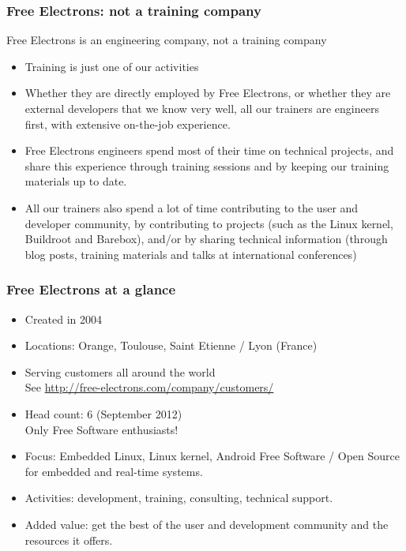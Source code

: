 \begin{frame}
\frametitle{Free Electrons: not a training company}
  Free Electrons is an engineering company, not a training company
  \begin{itemize}
    \item Training is just one of our activities
    \item Whether they are directly employed by Free Electrons, or whether
          they are external developers that we know very well, all 
          our trainers are engineers first, with extensive on-the-job
          experience.
    \item Free Electrons engineers spend most of their time on technical projects,
          and share this experience through training sessions and by
          keeping our training materials up to date.
    \item All our trainers also spend a lot of time contributing to the user
          and developer community, by contributing to projects (such as the Linux kernel,
          Buildroot and Barebox), and/or by sharing technical information (through
          blog posts, training materials and talks at international
          conferences)
  \end{itemize}
\end{frame}

\begin{frame}
\frametitle{Free Electrons at a glance}
  \begin{itemize}
    \item Created in 2004
    \item Locations: Orange, Toulouse, Saint Etienne / Lyon (France)
    \item Serving customers all around the world \\
          See \url{http://free-electrons.com/company/customers/}
    \item Head count: 6 (September 2012) \\
	  Only Free Software enthusiasts!
    \item Focus: Embedded Linux, Linux kernel, Android
          Free Software / Open Source
          for embedded and real-time systems.
    \item Activities: development, training, consulting, technical
          support.
    \item Added value: get the best of the user and development
          community and the resources it offers.
  \end{itemize}
\end{frame}

